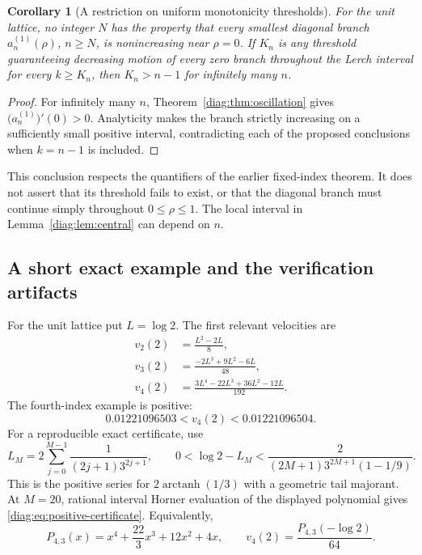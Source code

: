\documentclass[11pt,a4paper]{article}
\newtheorem{corollary}[theorem]{Corollary}
\theoremstyle{definition}
\theoremstyle{remark}
\numberwithin{equation}{section}
\begin{document}
\begin{corollary}[A restriction on uniform monotonicity thresholds]
\label{diag:cor:threshold}
For the unit lattice, no integer $N$ has the property that every smallest
diagonal branch $a_n^{(1)}(\rho)$, $n\geq N$, is nonincreasing near
$\rho=0$.  If $K_n$ is any threshold guaranteeing decreasing motion of
every zero branch throughout the Lerch interval for every $k\geq K_n$,
then $K_n>n-1$ for infinitely many $n$.
\end{corollary}

\begin{proof}
For infinitely many $n$, Theorem~\ref{diag:thm:oscillation} gives
$\bigl(a_n^{(1)}\bigr)'(0)>0$.  Analyticity makes the branch strictly
increasing on a sufficiently small positive interval, contradicting each
of the proposed conclusions when $k=n-1$ is included.
\end{proof}

This conclusion respects the quantifiers of the earlier fixed-index
theorem.  It does not assert that its threshold fails to exist, or that
the diagonal branch must continue simply throughout $0\leq\rho\leq1$.
The local interval in Lemma~\ref{diag:lem:central} can depend on $n$.

\subsection{A short exact example and the verification artifacts}
\label{diag:subsec:verification}

For the unit lattice put $L=\log2$.  The first relevant velocities are
\begin{align*}
 v_2(2)&=\frac{L^2-2L}{8},\\
 v_3(2)&=\frac{-2L^3+9L^2-6L}{48},\\
 v_4(2)&=\frac{3L^4-22L^3+36L^2-12L}{192}.
\end{align*}
The fourth-index example is positive:
\begin{equation}\label{diag:eq:positive-certificate}
 0.01221096503<v_4(2)<0.01221096504.
\end{equation}
For a reproducible exact certificate, use
\[
 L_M=2\sum_{j=0}^{M-1}\frac1{(2j+1)3^{2j+1}},\qquad
 0<\log2-L_M<
     \frac{2}{(2M+1)3^{2M+1}(1-1/9)}.
\]
This is the positive series for $2\operatorname{arctanh}(1/3)$ with a
geometric tail majorant.  At $M=20$, rational interval Horner evaluation
of the displayed polynomial gives \eqref{diag:eq:positive-certificate}.
Equivalently,
\[
 P_{4,3}(x)=x^4+\frac{22}{3}x^3+12x^2+4x,
 \qquad v_4(2)=\frac{P_{4,3}(-\log2)}{64}.
\]
\end{document}
